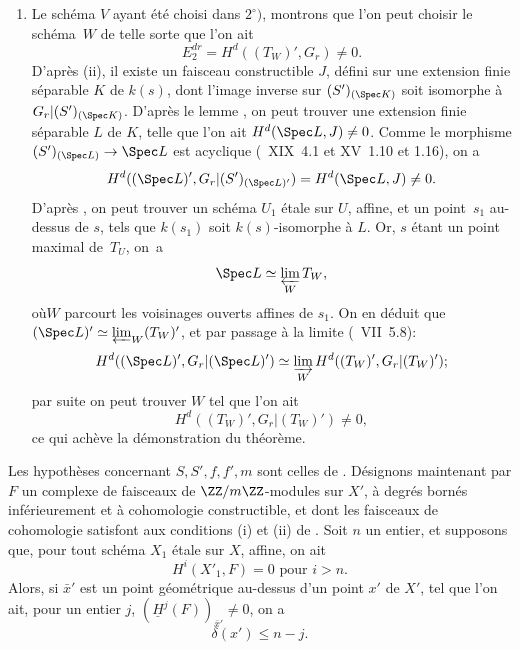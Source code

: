 \begin{enumerate}
\item[$3^\circ)$]
Le sch\'ema $V$ ayant \'et\'e choisi dans $2^\circ)$, montrons que l'on peut choisir le sch\'ema~$W$ de telle sorte que l'on ait
$$
E^{dr}_2 = H^d((T_W)', G_r) \neq 0.
$$
D'apr\`es \textup{(ii)}, il existe un faisceau constructible $J$, d\'efini sur une extension finie s\'eparable $K$ de $k(s)$, dont l'image inverse sur $(S')_{(\Spec K)}$ soit isomorphe \`a ${G_r}{|(S')_{(\Spec K)}}$. D'apr\`es le lemme , on peut trouver une extension finie s\'eparable $L$ de $K$, telle que l'on ait $H^d(\Spec L, J) \neq 0$. Comme le morphisme $(S')_{(\Spec L)} \to \Spec L$ est acyclique (~XIX~4.1 et XV~1.10 et 1.16), on a
$$
H^d((\Spec L)', {G_r}{|(S')_{(\Spec L)'}}) = H^d(\Spec L, J) \neq 0.
$$
D'apr\`es , on peut trouver un sch\'ema $U_1$ \'etale sur $U$, affine, et un point~$s_1$ au-dessus de $s$, tels que $k(s_1)$ soit $k(s)$-isomorphe \`a $L$. Or, $s$ \'etant un point maximal de~$T_U$, on~a
$$
\Spec L \simeq \varprojlim_W T_W,
$$
o\`u\pageoriginaled $W$ parcourt les voisinages ouverts affines de $s_1$. On en d\'eduit que $(\Spec L)' \simeq \varprojlim_W(T_W)'$, et par passage \`a la limite (~VII~5.8):
$$
H^d((\Spec L)', {G_r}{|(\Spec L)'}) \simeq \varinjlim_W H^d((T_W)', {G_r}{|(T_W)'});
$$
par suite on peut trouver $W$ tel que l'on ait
$$
H^d((T_W)', {G_r}{|(T_W)'})\neq 0,
$$
ce qui ach\`eve la d\'emonstration du th\'eor\`eme.
\end{enumerate}

\begin{corollaire} \label{XIV.3.6}
Les hypoth\`eses concernant $S, S', f, f', m$ sont celles de . D\'esignons maintenant par $F$ un complexe de faisceaux de $\ZZ/m\ZZ$-modules sur $X'$, \`a degr\'es born\'es inf\'erieurement et \`a cohomologie constructible, et dont les faisceaux de cohomologie satisfont aux conditions \textup{(i)} et \textup{(ii)} de . Soit $n$ un entier, et supposons que, pour tout sch\'ema $X_1$ \'etale sur $X$, affine, on ait
$$
H^i(X'_1, F)=0\text{ pour } i>n.
$$
Alors, si $\bar{x}'$ est un point g\'eom\'etrique au-dessus d'un point $x'$ de $X'$, tel que l'on ait, pour un entier $j$, $(\underline{H}^j(F))_{\bar{x}'} \neq 0$, on a
$$
\delta(x')\leq n-j.
$$
\end{corollaire}

